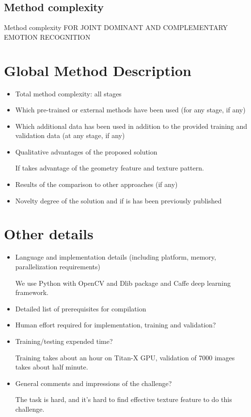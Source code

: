 \documentclass{article}
\begin{document}
\subsection{Method complexity}
Method complexity FOR JOINT DOMINANT AND COMPLEMENTARY EMOTION RECOGNITION


\section{Global Method Description}

\begin{itemize}
\item Total method complexity: all stages
\item Which pre-trained or external methods have been used (for any stage, if any)
\item Which additional data has been used in addition to the provided training and validation data (at any stage, if any)
\item Qualitative advantages of the proposed solution

If takes advantage of the geometry feature and texture pattern.
\item Results of the comparison to other approaches (if any)
\item Novelty degree of the solution and if is has been previously published
\end{itemize}

\section{Other details}

\begin{itemize}
\item Language and implementation details (including platform, memory, parallelization requirements)

We use Python with OpenCV and Dlib package and Caffe deep learning framework.
\item Detailed list of prerequisites for compilation
\item Human effort required for implementation, training and validation?
\item Training/testing expended time?

Training takes about an hour on Titan-X GPU, validation of 7000 images takes about half minute.
\item General comments and impressions of the challenge?

The task is hard, and it's hard to find effective texture feature to do this challenge.
\end{itemize}
\end{document}

